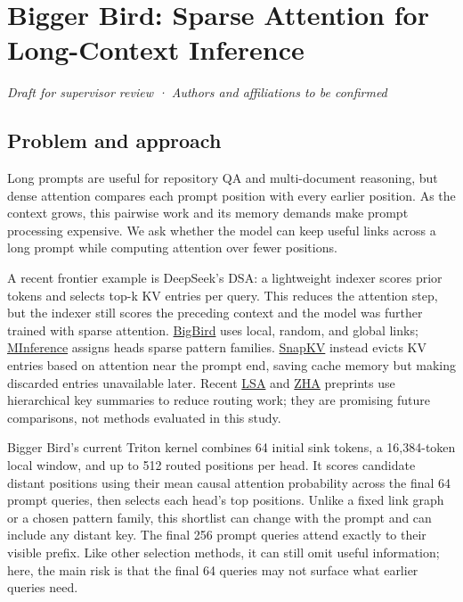\documentclass[
  10pt,
]{article}
\author{}
\date{}
\begin{document}
\section{Bigger Bird: Sparse Attention for Long-Context
Inference}\label{bigger-bird-sparse-attention-for-long-context-inference}

\emph{Draft for supervisor review · Authors and affiliations to be
confirmed}

\subsection{Problem and approach}\label{problem-and-approach}

Long prompts are useful for repository QA and multi-document reasoning,
but dense attention compares each prompt position with every earlier
position. As the context grows, this pairwise work and its memory
demands make prompt processing expensive. We ask whether the model can
keep useful links across a long prompt while computing attention over
fewer positions.

A recent frontier example is DeepSeek's DSA: a lightweight indexer
scores prior tokens and selects top-k KV entries per query. This reduces
the attention step, but the indexer still scores the preceding context
and the model was further trained with sparse attention.
\href{https://arxiv.org/abs/2007.14062}{BigBird} uses local, random, and
global links; \href{https://arxiv.org/abs/2407.02490}{MInference}
assigns heads sparse pattern families.
\href{https://arxiv.org/abs/2404.14469}{SnapKV} instead evicts KV
entries based on attention near the prompt end, saving cache memory but
making discarded entries unavailable later. Recent
\href{https://arxiv.org/abs/2610.42147}{LSA} and
\href{https://arxiv.org/abs/2610.42112}{ZHA} preprints use hierarchical
key summaries to reduce routing work; they are promising future
comparisons, not methods evaluated in this study.

Bigger Bird's current Triton kernel combines 64 initial sink tokens, a
16,384-token local window, and up to 512 routed positions per head. It
scores candidate distant positions using their mean causal attention
probability across the final 64 prompt queries, then selects each head's
top positions. Unlike a fixed link graph or a chosen pattern family,
this shortlist can change with the prompt and can include any distant
key. The final 256 prompt queries attend exactly to their visible
prefix. Like other selection methods, it can still omit useful
information; here, the main risk is that the final 64 queries may not
surface what earlier queries need.
\end{document}
